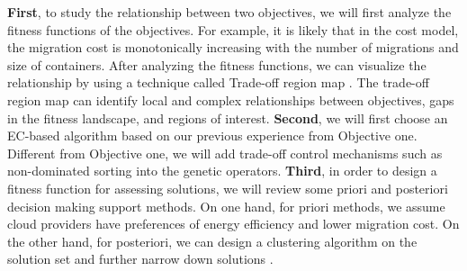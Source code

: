 \begin{itemize}
	 \textbf{First}, to study the relationship between two objectives, we will first analyze the fitness functions of the objectives. For example, it is likely that in the cost model, the migration cost is monotonically increasing with the number of migrations and size of containers. After analyzing the fitness functions, we can visualize the relationship by using a technique called Trade-off region map \cite{Pinheiro:2015eu}. The trade-off region map can identify local and complex relationships between objectives, gaps in the fitness landscape, and regions of interest. \textbf{Second}, we will first choose an EC-based algorithm based on our previous experience from Objective one. Different from Objective one, we will add trade-off control mechanisms such as non-dominated sorting into the genetic operators. \textbf{Third}, in order to design a fitness function for assessing solutions, we will review some priori and posteriori decision making support methods. On one hand, for priori methods, we assume cloud providers have preferences of energy efficiency and lower migration cost.  On the other hand, for posteriori, we can design a clustering algorithm on the solution set and further narrow down solutions \cite{Zio:2011iq}. 





\end{itemize}
